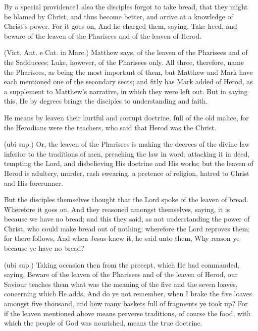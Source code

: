  By a special providence1 also the disciples forgot to take bread, that they might be blamed by Christ, and thus become better, and arrive at a knowledge of Christ’s power. For it goes on, And he charged them, saying, Take heed, and beware of the leaven of the Pharisees and of the leaven of Herod.

 (Vict. Ant. e Cat. in Marc.) Matthew says, of the leaven of the Pharisees and of the Sadducees; Luke, however, of the Pharisees only. All three, therefore, name the Pharisees, as being the most important of them, but Matthew and Mark have each mentioned one of the secondary sects; and fitly has Mark added of Herod, as a supplement to Matthew’s narrative, in which they were left out. But in saying this, He by degrees brings the disciples to understanding and faith.

 He means by leaven their hurtful and corrupt doctrine, full of the old malice, for the Herodians were the teachers, who said that Herod was the Christ.

 (ubi sup.) Or, the leaven of the Pharisees is making the decrees of the divine law inferior to the traditions of men, preaching the law in word, attacking it in deed, tempting the Lord, and disbelieving His doctrine and His works; but the leaven of Herod is adultery, murder, rash swearing, a pretence of religion, hatred to Christ and His forerunner.

 But the disciples themselves thought that the Lord spoke of the leaven of bread. Wherefore it goes on, And they reasoned amongst themselves, saying, it is because we have no bread; and this they said, as not understanding the power of Christ, who could make bread out of nothing; wherefore the Lord reproves them; for there follows, And when Jesus knew it, he said unto them, Why reason ye because ye have no bread?

 (ubi sup.) Taking occasion then from the precept, which He had commanded, saying, Beware of the leaven of the Pharisees and of the leaven of Herod, our Saviour teaches them what was the meaning of the five and the seven loaves, concerning which He adds, And do ye not remember, when I brake the five loaves amongst five thousand, and how many baskets full of fragments ye took up? For if the leaven mentioned above means perverse traditions, of course the food, with which the people of God was nourished, means the true doctrine.

 

